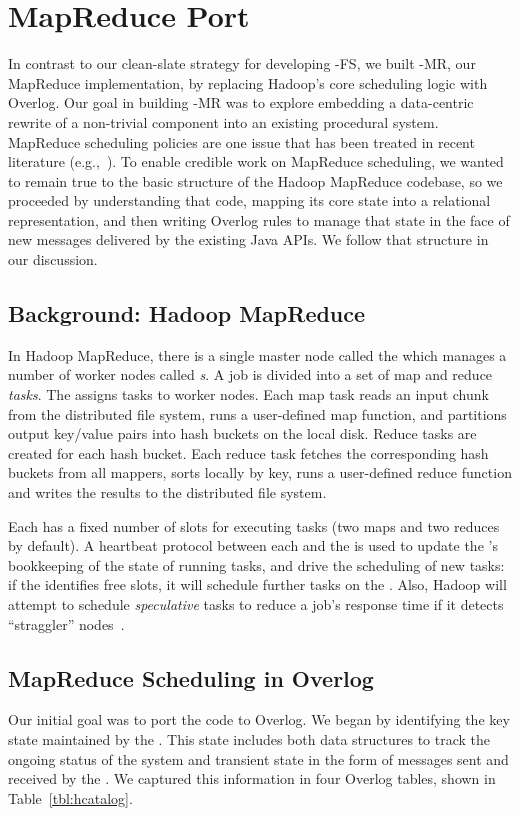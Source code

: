 \section{MapReduce Port}
\label{sec:mr}
In contrast to our clean-slate strategy for developing \BOOM-FS, we built
\BOOM-MR, our MapReduce implementation, by replacing Hadoop's core scheduling
logic with Overlog. Our goal in building \BOOM-MR was to explore embedding a
data-centric rewrite of a non-trivial component into an existing procedural
system.  MapReduce scheduling policies are one issue that has been treated in
recent literature (e.g.,~\cite{late-sched,delay-sched}).  To enable credible
work on MapReduce scheduling, we wanted to remain true to the basic structure of
the Hadoop MapReduce codebase, so we proceeded by understanding that code,
mapping its core state into a relational representation, and then writing
Overlog rules to manage that state in the face of new messages delivered by the
existing Java APIs.  We follow that structure in our discussion.

\subsection{Background: Hadoop MapReduce}
In Hadoop MapReduce, there is a single master node called the \emph{\JT} which
manages a number of worker nodes called \emph{{\TT}s}.  A job is divided into a
set of map and reduce \emph{tasks}. The {\JT} assigns tasks to worker nodes.  Each
map task reads an input chunk from the distributed file system, runs a
user-defined map function, and partitions output key/value pairs into hash
buckets on the local disk.  Reduce tasks are created for each hash
bucket.  Each reduce task fetches the corresponding hash buckets from all
mappers, sorts locally by key, runs a user-defined reduce function and writes
the results to the distributed file system.

Each {\TT} has a fixed number of slots for executing tasks (two maps and two
reduces by default). A heartbeat protocol between each {\TT} and the {\JT} is
used to update the {\JT}'s bookkeeping of the state of running tasks, and drive
the scheduling of new tasks: if the {\JT} identifies free {\TT} slots, it will
schedule further tasks on the {\TT}. Also, Hadoop will attempt to schedule
\emph{speculative} tasks to reduce a job's response time if it detects
``straggler'' nodes~\cite{mapreduce-osdi}.

\subsection{MapReduce Scheduling in Overlog}
\label{sec:mr-overlog}
Our initial goal was to port the {\JT} code to Overlog.  We began by identifying
the key state maintained by the {\JT}.  This state includes both data structures
to track the ongoing status of the system and transient state in the form of
messages sent and received by the {\JT}.  We captured this information in four
Overlog tables, shown in Table~\ref{tbl:hcatalog}.

